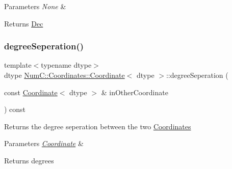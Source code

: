 \begin{DoxyParams}{Parameters}
{\em None} & \\
\hline
\end{DoxyParams}
\begin{DoxyReturn}{Returns}
\mbox{\hyperlink{class_num_c_1_1_coordinates_1_1_dec}{Dec}} 
\end{DoxyReturn}
\mbox{\label{class_num_c_1_1_coordinates_1_1_coordinate_aee597cfa5bb5402bd6d2c7a24578b0d0}} 
\subsubsection{\texorpdfstring{degree\+Seperation()}{degreeSeperation()}\hspace{0.1cm}{\footnotesize\ttfamily [1/2]}}
{\footnotesize\ttfamily template$<$typename dtype$>$ \\
dtype \mbox{\hyperlink{class_num_c_1_1_coordinates_1_1_coordinate}{Num\+C\+::\+Coordinates\+::\+Coordinate}}$<$ dtype $>$\+::degree\+Seperation (\begin{DoxyParamCaption}\item[{const \mbox{\hyperlink{class_num_c_1_1_coordinates_1_1_coordinate}{Coordinate}}$<$ dtype $>$ \&}]{in\+Other\+Coordinate }\end{DoxyParamCaption}) const\hspace{0.3cm}{\ttfamily [inline]}}

Returns the degree seperation between the two \mbox{\hyperlink{namespace_num_c_1_1_coordinates}{Coordinates}}


\begin{DoxyParams}{Parameters}
{\em \mbox{\hyperlink{class_num_c_1_1_coordinates_1_1_coordinate}{Coordinate}}} & \\
\hline
\end{DoxyParams}
\begin{DoxyReturn}{Returns}
degrees 
\end{DoxyReturn}
\mbox{\label{class_num_c_1_1_coordinates_1_1_coordinate_a0623947beab45b718c7da4d3b66ef0b6}} 
